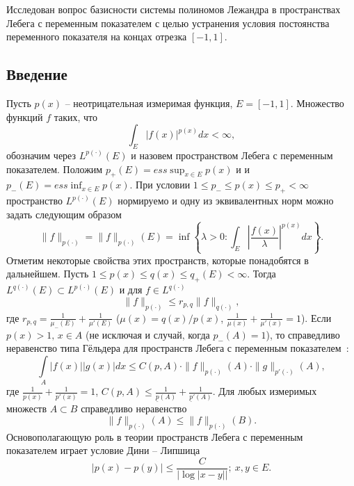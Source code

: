 Исследован вопрос базисности системы полиномов Лежандра в пространствах Лебега с переменным показателем с целью устранения условия постоянства переменного показателя на концах отрезка $[-1,1]$.


\subsection{Введение}

Пусть $p(x)$ -- неотрицательная измеримая функция, $E=[-1,1]$. Множество функций $f$ таких, что
\begin{equation}\label{s2-lpx-def-1}
  \int_{E}|f(x)|^{p(x)}dx<\infty,
\end{equation}
обозначим через $L^{p(\cdot)}(E)$ и назовем пространством Лебега с переменным показателем. Положим $p_+(E)=ess\sup_{x\in E} p(x)$ и и $p_-(E)=ess\inf_{x\in E} p(x)$. При условии $1\le p_-\le p(x)\le p_+<\infty$ пространство $L^{p(\cdot)}(E)$ нормируемо \cite{tad-lpxtopology} и одну из эквивалентных норм можно задать следующим образом
\begin{equation}\label{s2-lpx-norm}
  \|f\|_{p(\cdot)}=\|f\|_{p(\cdot)}(E)=\inf\left\{\lambda>0:\int_{E}\left|\frac{f(x)}\lambda\right|^{p(x)}dx\right\}.
\end{equation}
Отметим некоторые свойства этих пространств, которые понадобятся в дальнейшем. Пусть $1\le p(x)\le q(x)\le q_+(E)<\infty$. Тогда \cite{tad-SHII-Haar} $L^{q(\cdot)}(E)\subset L^{p(\cdot)}(E)$ и для $f\in L^{q(\cdot)}$
\begin{equation}\label{LpxLqxNormIneq}
  \|f\|_{p(\cdot)}\le r_{p,q}\|f\|_{q(\cdot)},
\end{equation}
где $r_{p,q}=\frac1{\mu_-(E)}+\frac1{\mu'(E)}$ ($\mu(x)=q(x)/p(x)$, $\frac1{\mu(x)}+\frac1{\mu'(x)}=1$).
Если $p(x)>1,\, x \in A$ (не исключая и случай, когда $p_-(A)=1$), то справедливо неравенство типа Гёльдера для пространств Лебега с переменным показателем~\cite[нер-во (8)]{tad-lpxtopology}:
\begin{equation}\label{LpxHoelderIneq}
  \int\limits_A |f(x)||g(x)|dx \le
  C(p,A) \cdot \|f\|_{p(\cdot)}(A) \cdot \|g\|_{p'(\cdot)}(A),
\end{equation}
где $\frac{1}{p(x)}+\frac{1}{p'(x)}=1$, $C(p,A)\le \frac{1}{\underline{p}(A)}+\frac{1}{\underline{p}'(A)}$.
Для любых измеримых множеств $A\subset B$ справедливо неравенство
\begin{equation}\label{LpxNormSubsetIneq}
  \|f\|_{p(\cdot)}(A) \le \|f\|_{p(\cdot)}(B).
\end{equation}
Основополагающую роль в теории пространств Лебега с переменным показателем играет условие Дини -- Липшица
\begin{equation}\label{DiniLipCond}
	|p(x)-p(y)| \le \frac{C}{|\log |x-y||};\ x,y \in E.
\end{equation}


